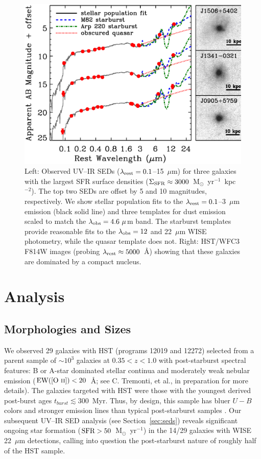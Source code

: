 \documentclass[apj]{emulateapj}
\newcommand{\oii}{[\textrm{O}~\textsc{ii}]}
\newcommand{\msun}{M$_{\odot}$}
\newcommand{\units}{M$_{\odot}$~yr$^{-1}$~kpc$^{-2}$}
\newcommand{\lrest}{\lambda_{\textnormal{\scriptsize{rest}}}}
\newcommand{\lobs}{\lambda_{\textnormal{\scriptsize{obs}}}}
\newcommand{\sigmasfr}{\Sigma_{\textnormal{\scriptsize{SFR}}}}
\begin{document}
\begin{figure}[!t]
\includegraphics[angle=0,scale=0.41]{f1.ps}
\caption{Left: Observed UV--IR SEDs ($\lrest=0.1$--15~$\mu$m) for
  three galaxies with the largest SFR surface densities
  ($\sigmasfr\approx3000$~\units).  The top two SEDs are offset by 5
  and 10 magnitudes, respectively.  We show stellar population fits to
  the $\lrest=0.1$--3~$\mu$m emission (black solid line) and three
  templates for dust emission \citep[M82 starburst, blue dashed line;
    Arp 220 starburst, green dot-dashed line; obscured quasar, red
    dotted line;][]{pol07} scaled to match the $\lobs=4.6~\mu$m band.
  The starburst templates provide reasonable fits to the $\lobs=12$
  and 22~$\mu$m WISE photometry, while the quasar template does not.
  Right: HST/WFC3 F814W images (probing $\lrest\approx5000$~\AA)
  showing that these galaxies are dominated by a compact nucleus.}
\label{fig:seds}
\end{figure}


\section{Analysis}

\subsection{Morphologies and Sizes}

We observed 29 galaxies with HST (programs 12019 and 12272) selected
from a parent sample of $\sim10^3$ galaxies at $0.35<z<1.0$ with
post-starburst spectral features: B or A-star dominated stellar
continua and moderately weak nebular emission
($\textnormal{EW}(\oii)<20$~\AA; see C. Tremonti, et al., in
preparation for more details).  The galaxies targeted with HST were
those with the youngest derived post-burst ages
$t_{burst}\lesssim300$~Myr.  Thus, by design, this sample has bluer
$U-B$ colors and stronger emission lines than typical post-starburst
samples \citep{coi11}.  Our subsequent UV--IR SED analysis (see
Section~\ref{sec:seds}) reveals significant ongoing star formation
($\textnormal{SFR}>50$~\msun~yr$^{-1}$) in the 14/29 galaxies with
WISE 22~$\mu$m detections, calling into question the post-starburst
nature of roughly half of the HST sample.
\end{document}
